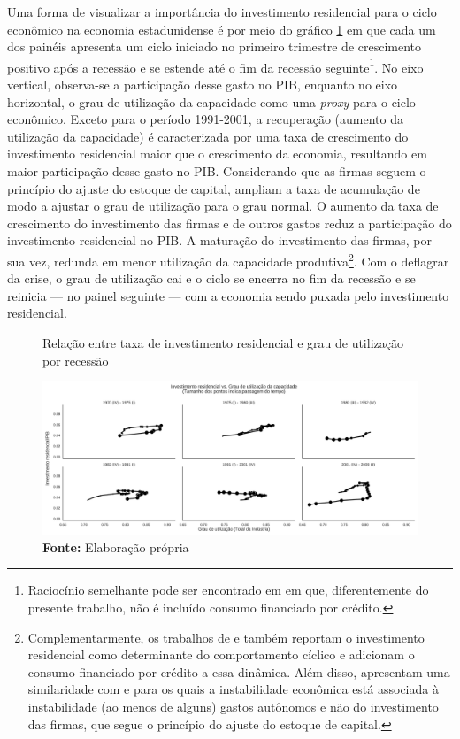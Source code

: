 Uma forma de visualizar a importância do investimento residencial para o ciclo econômico na economia estadunidense é por meio do gráfico \ref{FigIh_u} em que cada um dos painéis apresenta um ciclo iniciado no primeiro trimestre de crescimento positivo após a recessão e se estende até o fim da recessão seguinte\footnote{
	Raciocínio semelhante pode ser encontrado em \textcite{fiebiger_semi-autonomous_2018} em que, diferentemente do presente trabalho, não é incluído consumo financiado por crédito.}. 
No eixo vertical, observa-se a participação desse gasto no PIB, enquanto no eixo horizontal, o grau de utilização da capacidade como uma \textit{proxy} para o ciclo econômico. Exceto para o período 1991-2001, a recuperação (aumento da utilização da capacidade) é caracterizada por uma taxa de crescimento do investimento residencial maior que o crescimento da economia, resultando em maior participação desse gasto no PIB. Considerando que as firmas seguem o princípio do ajuste do estoque de capital, ampliam a taxa de acumulação de modo a ajustar o grau de utilização para o grau normal. O aumento da taxa de crescimento do investimento das firmas e de outros gastos reduz a participação do investimento residencial no PIB. A maturação do investimento das firmas, por sua vez, redunda em menor utilização da capacidade produtiva\footnote{
	Complementarmente, os trabalhos de \textcite{fiebiger_semi-autonomous_2018} e \textcite{fiebiger_trend_2017} também reportam o investimento residencial como determinante do comportamento cíclico e adicionam o consumo financiado por crédito a essa dinâmica. Além disso, apresentam uma similaridade com \textcite{dejuan_hidden_2017} e \textcite{teixeira_crescimento_2015} para os quais a instabilidade econômica está associada à instabilidade (ao menos de alguns) gastos autônomos e não do investimento das firmas, que segue o princípio do ajuste do estoque de capital.}. 
Com o deflagrar da crise, o grau de utilização cai e o ciclo se encerra no fim da recessão e se reinicia --- no painel seguinte --- com a economia sendo puxada pelo investimento residencial.



\begin{figure}[H]
	\centering
	\caption{Relação entre taxa de investimento residencial e grau de utilização por recessão}
	\label{FigIh_u}
	\includegraphics[width=\textwidth]{../../Dados/Fatos_Estilizados/figs/Ciclo_Ih_u.png}
	\caption*{\textbf{Fonte:} Elaboração própria}
\end{figure}

